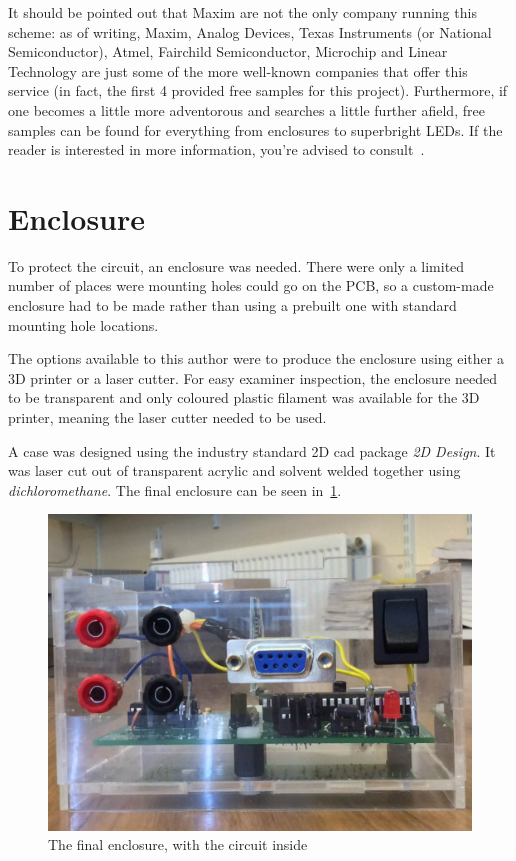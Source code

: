 It should be pointed out that Maxim are not the only company running this
scheme: as of writing, Maxim, Analog Devices, Texas Instruments (or National
Semiconductor), Atmel, Fairchild Semiconductor, Microchip and Linear Technology
are just some of the more well-known companies that offer this service (in fact,
the first 4 provided free samples for this project). Furthermore, if one becomes
a little more adventorous and searches a little further afield, free samples can
be found for everything from enclosures to superbright LEDs. If the reader is
interested in more information, you're advised to
consult~\textcite{LadyAdaSamples}.

\section{Enclosure}

To protect the circuit, an enclosure was needed. There were only a limited
number of places were mounting holes could go on the PCB, so a custom-made
enclosure had to be made rather than using a prebuilt one with standard mounting
hole locations.

The options available to this author were to produce the enclosure using either
a 3D printer or a laser cutter. For easy examiner inspection, the enclosure
needed to be transparent and only coloured plastic filament was available for
the 3D printer, meaning the laser cutter needed to be used.

A case was designed using the industry standard 2D cad package \textit{2D
Design}. It was laser cut out of transparent acrylic and solvent welded together
using \textit{dichloromethane}. The final enclosure can be seen
in~\cref{fig:enclosurePhoto}.

\begin{figure}
  \includegraphics[width=\linewidth]{img/enclosure.jpg}
  \caption{The final enclosure, with the circuit inside}
  \label{fig:enclosurePhoto}
\end{figure}


